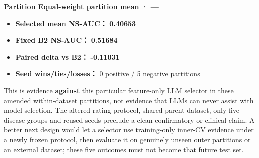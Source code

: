 \documentclass[
  10pt,
]{ctexart}
\providecommand{\tightlist}{%
  \setlength{\itemsep}{0pt}\setlength{\parskip}{0pt}}
\begin{document}
\textbf{Partition Equal-weight partition mean · ---}

\begin{itemize}
\tightlist
\item
  \textbf{Selected mean NS-AUC：} \textbf{0.40653}
\item
  \textbf{Fixed B2 NS-AUC：} \textbf{0.51684}
\item
  \textbf{Paired delta vs B2：} \textbf{-0.11031}
\item
  \textbf{Seed wins/ties/losses：} 0 positive / 5 negative partitions
\end{itemize}

This is evidence \textbf{against} this particular feature-only LLM
selector in these amended within-dataset partitions, not evidence that
LLMs can never assist with model selection. The altered rating protocol,
shared parent dataset, only five disease groups and reused seeds
preclude a clean confirmatory or clinical claim. A better next design
would let a selector use training-only inner-CV evidence under a newly
frozen protocol, then evaluate it on genuinely unseen outer partitions
or an external dataset; these five outcomes must not become that future
test set.
\end{document}
